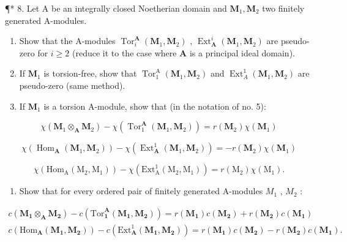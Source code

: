 ¶* 8. Let A be an integrally closed Noetherian domain and \(\mathbf{M}_1, \mathbf{M}_2\) two finitely generated A-modules.

\begin{enumerate}
\def\labelenumi{(\alph{enumi})}
\item
  Show that the A-modules \(\operatorname{Tor}_i^{\mathbf{A}}(\mathbf{M}_1, \mathbf{M}_2)\) , \(\operatorname{Ext}_{\mathbf{A}}^{i}(\mathbf{M}_1, \mathbf{M}_2)\) are pseudo-zero for \(i \geqslant 2\) (reduce it to the case where \(\mathbf{A}\) is a principal ideal domain).
\item
  If \(\mathbf{M}_1\) is torsion-free, show that \(\operatorname{Tor}_1^{\mathrm{A}}(\mathbf{M}_1, \mathbf{M}_2)\) and \(\operatorname{Ext}_A^1(\mathbf{M}_1, \mathbf{M}_2)\) are pseudo-zero (same method).
\item
  If \(\mathbf{M}_1\) is a torsion A-module, show that (in the notation of no. 5):
\end{enumerate}

\[
\chi (\mathbf {M} _ {1} \otimes_ {\mathbf {A}} \mathbf {M} _ {2}) - \chi (\operatorname{Tor} _ {1} ^ {\mathbf {A}} (\mathbf {M} _ {1}, \mathbf {M} _ {2})) = r (\mathbf {M} _ {2}) \chi (\mathbf {M} _ {1})
\]

\[
\chi (\operatorname{Hom} _ {\mathbf {A}} (\mathbf {M} _ {1}, \mathbf {M} _ {2})) - \chi (\operatorname{Ext} _ {\mathbf {A}} ^ {1} (\mathbf {M} _ {1}, \mathbf {M} _ {2})) = - r (\mathbf {M} _ {2}) \chi (\mathbf {M} _ {1})
\]

\[
\chi (\mathrm{Hom} _ {\mathrm{A}} (\mathrm{M} _ {2}, \mathrm{M} _ {1})) - \chi (\mathrm{Ext} _ {\mathrm{A}} ^ {1} (\mathrm{M} _ {2}, \mathrm{M} _ {1})) = r (\mathrm{M} _ {2}) \chi (\mathrm{M} _ {1}).
\]

\begin{enumerate}
\def\labelenumi{(\alph{enumi})}
\setcounter{enumi}{3}
\tightlist
\item
  Show that for every ordered pair of finitely generated A-modules \(M_{1}\) , \(M_{2}\) :
\end{enumerate}

\[
\begin{array}{r} c (\mathbf {M _ {1}} \otimes_ {\mathbf {A}} \mathbf {M _ {2}}) - c (\mathrm{Tor} _ {\mathbf {1}} ^ {\mathbf {A}} (\mathbf {M _ {1}}, \mathbf {M _ {2}})) = r (\mathbf {M _ {1}}) c (\mathbf {M _ {2}}) + r (\mathbf {M _ {2}}) c (\mathbf {M _ {1}}) \\ c (\mathrm{Hom} _ {\mathbf {A}} (\mathbf {M _ {1}}, \mathbf {M _ {2}})) - c (\mathrm{Ext} _ {\mathbf {A}} ^ {1} (\mathbf {M _ {1}}, \mathbf {M _ {2}})) = r (\mathbf {M _ {1}}) c (\mathbf {M _ {2}}) - r (\mathbf {M _ {2}}) c (\mathbf {M _ {1}}). \end{array}
\]

